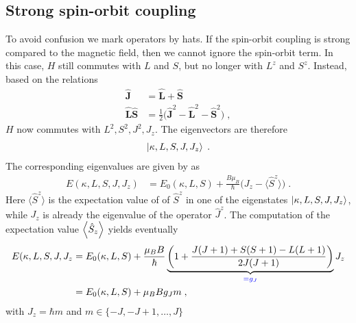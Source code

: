 \subsection{Strong spin-orbit coupling}
To avoid confusion we mark operators by hats.
If the spin-orbit coupling is strong compared to the magnetic field, then we cannot ignore the
spin-orbit term. In this case, $H$ still commutes with $L$ and $S$, 
but  no longer with $L^{z}$ and $S^{z}$. Instead, based on the relations
%
\newcommand{\vop}[1]{{\boldsymbol{ \hat #1}}}
\newcommand{\opp}[1]{ \hat {#1} }
\begin{align}
 \vop J &= \vop L + \vop S\\
\vop L\vop S &=\frac{1}{2}\bigg( \vop J^{2}-\vop L^{2}-\vop S^{2} \bigg)\;,\label{eq:para:2}
\end{align}
%
$H$ now commutes  with $L^{2},S^{2},J^{2},J_{z}$. The eigenvectors are therefore
%
\begin{align*}
\ket{\kappa,L,S,J,J_{z}}\;.
\end{align*}
%
The corresponding eigenvalues are given by   as
%
\begin{align*}
E(\kappa,L,S,J,J_{z}) &=E_{0}(\kappa,L,S) + \frac{B \mu_{B}}{\hbar}
\bigg(  J_{z} -\langle \opp S^{z} \rangle \bigg)\;.
\end{align*}
%
Here $\langle \opp S^{z} \rangle$ is the expectation value of of $\opp S^{z}$ in one of the eigenstates
$\ket{\kappa,L,S,J,J_{z}}$, while $J_{z}$ is already the eigenvalue of the operator $\opp J^{z}$.
%
The computation of the expectation value $\left\langle\hat S_{z}\right\rangle$ yields eventually 
%
\begin{align*}
E(\kappa,L,S,J,J_{z} &= E_{0}(\kappa,L,S) + \frac{\mu_{B}B}{\hbar}\underbrace{
\bigg(  1+  \frac{J(J+1)+S(S+1)-L(L+1)}{2 J(J+1)} \bigg)
}_{\color{blue} = g_{J}}J_{z}\\
&= E_{0}(\kappa,L,S) + \mu_{B}B g_{J} m\;,
\end{align*}
%
with $J_{z} = \hbar m$ and $m\in \{-J,-J+1,\dots,J\}$ 

